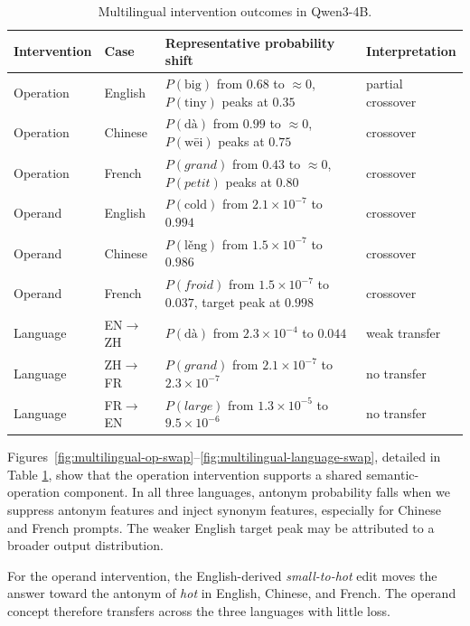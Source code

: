\begin{table}[htbp!]
  \centering
  \small
  \begin{tabular}{@{}llll@{}}
    \toprule
    Intervention & Case & Representative probability shift & Interpretation \\
    \midrule
    Operation & English & $P(\mathrm{big})$ from $0.68$ to $\approx 0$, $P(\mathrm{tiny})$ peaks at $0.35$ & partial crossover \\
    Operation & Chinese & $P(\text{d\`{a}})$ from $0.99$ to $\approx 0$, $P(\text{w\=ei})$ peaks at $0.75$ & crossover \\
    Operation & French  & $P(\textit{grand})$ from $0.43$ to $\approx 0$, $P(\textit{petit})$ peaks at $0.80$ & crossover \\
    \midrule
    Operand & English & $P(\mathrm{cold})$ from $2.1\!\times\!10^{-7}$ to $0.994$ & crossover \\
    Operand & Chinese & $P(\text{l\v{e}ng})$ from $1.5\!\times\!10^{-7}$ to $0.986$ & crossover \\
    Operand & French & $P(\textit{froid})$ from $1.5\!\times\!10^{-7}$ to $0.037$, target peak at $0.998$ & crossover \\
    \midrule
    Language & EN$\to$ZH & $P(\text{d\`{a}})$ from $2.3\!\times\!10^{-4}$ to $0.044$ & weak transfer \\
    Language & ZH$\to$FR & $P(\textit{grand})$ from $2.1\!\times\!10^{-7}$ to $2.3\!\times\!10^{-7}$ & no transfer \\
    Language & FR$\to$EN & $P(\textit{large})$ from $1.3\!\times\!10^{-5}$ to $9.5\!\times\!10^{-6}$ & no transfer \\
    \bottomrule
  \end{tabular}
  \caption{Multilingual intervention outcomes in Qwen3-4B.}
  \label{tab:multilingual-summary}
\end{table}

Figures~\ref{fig:multilingual-op-swap}--\ref{fig:multilingual-language-swap}, detailed in Table \ref{tab:multilingual-summary}, show that the operation intervention supports a shared semantic-operation component.  In
all three languages, antonym probability falls when we suppress antonym features
and inject synonym features, especially for Chinese and French prompts.  
The weaker English target peak may be attributed to a broader output distribution.

For the operand intervention, the English-derived \textit{small-to-hot} edit
moves the answer toward the antonym of \textit{hot} in English, Chinese, and
French. The operand concept therefore transfers across the
three languages with little loss.

